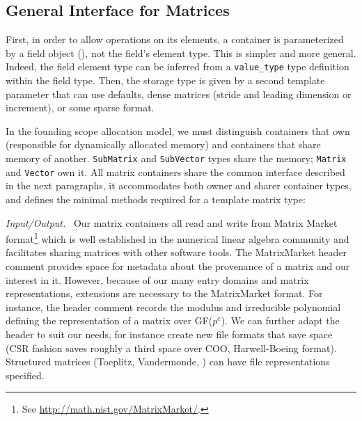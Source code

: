 \subsection{General Interface for %
Matrices}
%
First, in order to allow operations on its elements, a container is
parameterized by a field object (), not the field's element
type. This is simpler and more general.
Indeed, the field element type can be inferred from a
\verb!value_type! type definition within the field type.
Then, the storage type is given by a second
template parameter that can use defaults,
\eg dense \blas matrices (stride
and leading dimension or increment), or some sparse format.
%

%
In the founding scope allocation model, we must distinguish containers that own (responsible for
dynamically allocated memory) and containers that share memory of another.
\texttt{SubMatrix} and \texttt{SubVector} types share the memory;
\texttt{Matrix} and \texttt{Vector} own it.
%
All matrix containers share the common \applin  interface
described in the next paragraphs, it accommodates both owner and sharer
container types, and defines the minimal methods required for a
template \applin matrix type:
%
% 
%
%
\def\monitem#1{\par\textit{#1}\ }
\monitem{Input/Output.}
		Our matrix containers all read and write from Matrix Market
		format\footnote{See \url{http://math.nist.gov/MatrixMarket/}.}
		which is well established in the numerical linear algebra
		community and facilitates sharing matrices with other software
		tools.  The MatrixMarket header comment provides space for
		metadata about the provenance of a matrix and our interest in
		it.  However, because of our many entry domains and matrix
		representations, extensions are necessary to the MatrixMarket
		format.  For instance, the header comment records the modulus
		and irreducible polynomial defining the representation of a
		matrix over GF($p^e$).
		We can further adapt the header to suit our needs, for instance
		create new file formats that save space (\eg CSR fashion saves
		roughly a third space over COO, \cf Harwell-Boeing format).
		Structured matrices (Toeplitz, Vandermonde, \etc) can have file
		representations specified.
